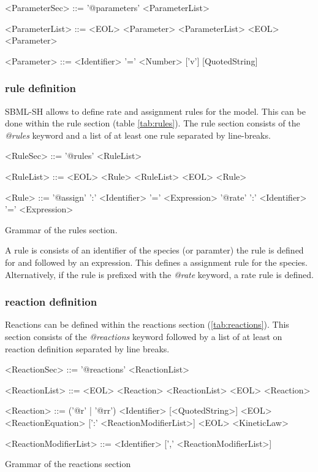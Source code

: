 \documentclass[a4paper]{article}
\begin{document}
\begin{table} [h!]
\begin{grammar}
<ParameterSec> ::= '@parameters' <ParameterList>

<ParameterList> ::= <EOL> <Parameter> <ParameterList>
  \alt <EOL> <Parameter>
  
<Parameter> ::= <Identifier> '=' <Number> ['v'] [QuotedString]
\end{grammar}
\end{table}


\subsubsection*{rule definition}
SBML-SH allows to define rate and assignment rules for the model. This can be done within the rule section (table \ref{tab:rules}). The rule section consists of the \emph{@rules} keyword and a list of at least one rule separated by line-breaks. 

\begin{table}[h!]
\begin{grammar}
<RuleSec> ::= '@rules' <RuleList>

<RuleList> ::= <EOL> <Rule> <RuleList>
  \alt <EOL> <Rule>
  
<Rule> ::= '@assign' ':' <Identifier> '=' <Expression>
\alt '@rate' ':' <Identifier> '=' <Expression>
\end{grammar}
\caption{Grammar of the rules section.} \label{tab:rules}
\end{table}

A rule is consists of an identifier of the species (or paramter) the rule is defined for and followed by an expression. This defines a assignment rule for the species. Alternatively, if the rule is prefixed with the \emph{@rate} keyword, a rate rule is defined.


\subsubsection*{reaction definition}
Reactions can be defined within the reactions section (\ref{tab:reactions}). This section consists of the \emph{@reactions} keyword followed by a list of at least on reaction definition separated by line breaks. 

\begin{table}[h!]
\begin{grammar}
<ReactionSec> ::= '@reactions' <ReactionList>

<ReactionList> ::= <EOL> <Reaction> <ReactionList>
  \alt <EOL> <Reaction>
  
<Reaction> ::= ('@r' | '@rr') <Identifier> [<QuotedString>] <EOL> <ReactionEquation> [':' <ReactionModifierList>] <EOL> <KineticLaw>

<ReactionModifierList> ::= <Identifier> [',' <ReactionModifierList>]
\end{grammar}
\caption{Grammar of the reactions section} \label{tab:reactions}
\end{table}
\end{document}

